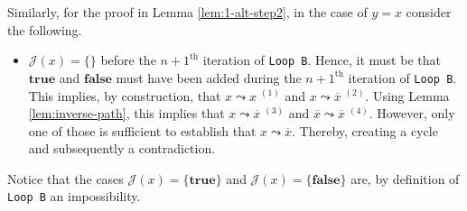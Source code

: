 \documentclass [11pt]{article}
\newcommand{\True}{\mathbf{true}}
\newcommand{\False}{\mathbf{false}}
\newcommand{\reach}{\leadsto}
\begin{document}
\bigskip

Similarly, for the proof in Lemma \ref{lem:1-alt-step2}, in the case of $y=x$ consider the following.


\begin{itemize}
\item $\mathcal{J}(x)=\{\}$ before the $n+1^{\text{th}}$ iteration of \texttt{Loop B}. Hence, it must be that $\True$ and $\False$  must have been added during the $n+1^{\text{th}}$ iteration of \texttt{Loop B}. This implies, by construction, that $x \reach x\; ^{(1)}$ and $x \reach \overline{x}\; ^{(2)}$. Using Lemma \ref{lem:inverse-path}, this implies that $x \reach \overline{x}\;^{(3)}$ and $\overline{x} \reach \overline{x}\;^{(4)}$. However, only one of those is sufficient to establish that $x \reach \overline{x}$. Thereby, creating a cycle and subsequently a contradiction. 

\begin{center}
\end{center}
 
 \end{itemize}
Notice that the cases $\mathcal{J}(x)=\{\True\}$ and  $\mathcal{J}(x)=\{\False\}$ are, by definition of \texttt{Loop B} an impossibility. 
\end{document}
